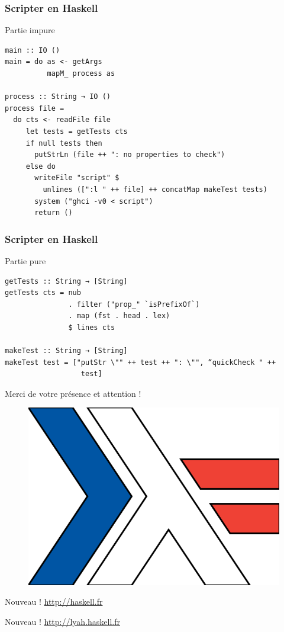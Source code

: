 \documentclass[10pt]{beamer}
\begin{document}
\begin{frame}[fragile]
\frametitle{Scripter en Haskell}
\begin{block}{Partie impure}
\begin{verbatim}
main :: IO ()
main = do as <- getArgs
          mapM_ process as

process :: String → IO ()
process file =
  do cts <- readFile file
     let tests = getTests cts
     if null tests then
       putStrLn (file ++ ": no properties to check")
     else do
       writeFile "script" $
         unlines ([":l " ++ file] ++ concatMap makeTest tests)
       system ("ghci -v0 < script")
       return ()
\end{verbatim}
\end{block}
\end{frame}



\begin{frame}[fragile]
\frametitle{Scripter en Haskell}
\begin{block}{Partie pure}
\begin{verbatim}
getTests :: String → [String]
getTests cts = nub
               . filter ("prop_" `isPrefixOf`)
               . map (fst . head . lex)
               $ lines cts

makeTest :: String → [String]
makeTest test = ["putStr \"" ++ test ++ ": \"", “quickCheck " ++
                  test]
\end{verbatim}
\end{block}
\end{frame}



\begin{frame}
\centerline{Merci de votre présence et attention !}

\begin{figure}
\includegraphics[scale=0.4]{haskell_fr_logo.png}
\end{figure}

\centerline{Nouveau ! \url{http://haskell.fr}}

\centerline{Nouveau ! \url{http://lyah.haskell.fr}}
\end{frame}
\end{document}
